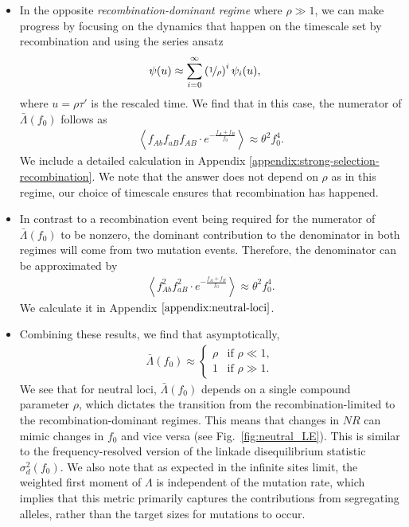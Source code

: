 \documentclass[aps,rmp,twocolumn,groupedaddress,floatfix,notitlepage]{revtex4-1}
\begin{document}
\begin{itemize}
\item In the opposite \emph{recombination-dominant regime} where $\rho \gg 1$, we can make progress by focusing on the dynamics that happen on the timescale set by recombination and using the series ansatz
\begin{align}\label{eq:psi(u)_series_main_text}
    \psi(u) &\approx \sum_{i=0}^\infty \left(\nicefrac{1}{\rho}\right)^i \psi_i (u),
\end{align}
where $u = \rho\tau'$ is the rescaled time. We find that in this case, the numerator of $\bar{\Lambda}(f_0)$ follows as 
\begin{align}\label{eq:lambda_num_large_rho_neutral_main_text}
    \left\langle f_{Ab}f_{aB}f_{AB}\cdot e^{-\frac{f_{A}+f_{B}}{f_0}}\right\rangle \approx \theta^2 f_0^4.
\end{align}
We include a detailed calculation in Appendix \ref{appendix:strong-selection-recombination}. We note that the answer does not depend on $\rho$ as in this regime, our choice of timescale ensures that recombination has happened.

\item In contrast to a recombination event being required for the numerator of $\bar{\Lambda}(f_0)$ to be nonzero, the dominant contribution to the denominator in both regimes will come from two mutation events. Therefore, the denominator can be approximated by
\begin{align}\label{eq:lambda_denom_neutral_main_text}
    \left\langle f_{Ab}^2f_{aB}^2\cdot e^{-\frac{f_{A}+f_{B}}{f_0}}\right\rangle
    \approx \theta^2 f_0^4.
\end{align}
We calculate it in Appendix $\ref{appendix:neutral-loci}$.

\item Combining these results, we find that asymptotically, 
\begin{align}\label{eq:lambda_neutral_result}
    \bar{\Lambda}(f_0) \approx
    \begin{cases}
        \rho & \text{if $\rho \ll 1$},\\
        1 & \text{if $\rho \gg 1$}.
    \end{cases}
\end{align}
We see that for neutral loci, $\bar{\Lambda}(f_0)$ depends on a single compound parameter $\rho$, which dictates the transition from the recombination-limited to the recombination-dominant regimes. This means that changes in $NR$ can mimic changes in $f_0$ and vice versa (see Fig.~\ref{fig:neutral_LE}). This is similar to the frequency-resolved version of the linkade disequilibrium statistic $\sigma_d^2 (f_0)$. We also note that as expected in the infinite sites limit, the weighted first moment of $\Lambda$ is independent of the mutation rate, which implies that this metric primarily captures the contributions from segregating alleles, rather than the target sizes for mutations to occur. 


\end{itemize}
\end{document}
